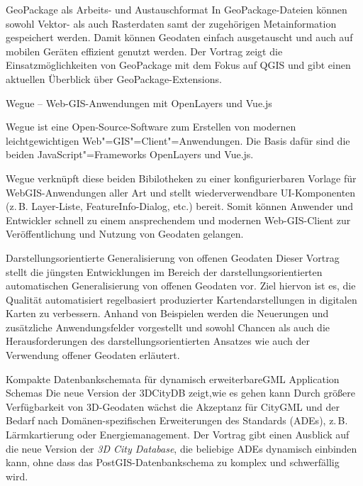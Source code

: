 %
{GeoPackage als Arbeits- und \mbox{Austauschformat}}%
{}%
{%
In GeoPackage-Dateien können sowohl Vektor- als auch Rasterdaten samt der zugehörigen Metainformation
gespeichert werden. Damit können Geodaten einfach ausgetauscht und auch auf mobilen Geräten
effizient genutzt werden.  Der Vortrag zeigt die Einsatzmöglichkeiten von GeoPackage mit dem Fokus
auf QGIS und gibt einen aktuellen Überblick über GeoPackage-Extensions.%
}

%
{Wegue -- Web-GIS-Anwendungen mit OpenLayers und Vue.js}%
{}%
{%
Wegue ist eine Open-Source-Software zum Erstellen von modernen leichtgewichtigen
Web"=GIS"=Client"=Anwendungen. Die Basis dafür sind die beiden JavaScript"=Frameworks OpenLayers und
Vue.js.

Wegue verknüpft diese beiden Bibilotheken zu einer konfigurierbaren Vorlage für WebGIS-Anwendungen
aller Art und stellt wiederverwendbare UI-Komponenten (z.\,B. Layer-Liste, FeatureInfo-Dialog, etc.)
bereit. Somit können Anwender und Entwickler schnell zu einem ansprechendem und modernen
Web-GIS-Client zur Ver\-öf\-fent\-li\-chung und Nutzung von Geodaten gelangen.%
}

%
{Darstellungsorientierte Generalisierung von offenen Geodaten}%
{}%
{%
Dieser Vortrag stellt die jüngsten Entwicklungen im Bereich der darstellungsorientierten
automatischen Generalisierung von offenen Geodaten vor. Ziel hiervon ist es, die Qualität
automatisiert regelbasiert produzierter Kartendarstellungen in digitalen Karten zu verbessern.
Anhand von Beispielen werden die Neuerungen und zusätzliche Anwendungsfelder vorgestellt und sowohl
Chancen als auch die Herausforderungen des darstellungsorientierten Ansatzes wie auch der
Verwendung offener Geodaten erläutert.%
}



%
{Kompakte Datenbankschemata für \mbox{dynamisch} erweiterbare\linebreak GML Application Schemas\vspace{0.2em}}%
{Die neue Version der 3DCityDB zeigt,\linebreak wie es gehen kann}%
{%
Durch größere Verfügbarkeit von 3D-Geodaten wächst die Akzeptanz für CityGML und der Bedarf nach
Domänen-spezifischen Erweiterungen des Standards (ADEs), z.\,B. Lärmkartierung oder
Energiemanagement. Der Vortrag gibt einen Ausblick auf die neue Version der \emph{3D City Database}, die
beliebige ADEs dynamisch einbinden kann, ohne dass das PostGIS-Datenbankschema zu komplex und
schwerfällig wird.%
}

